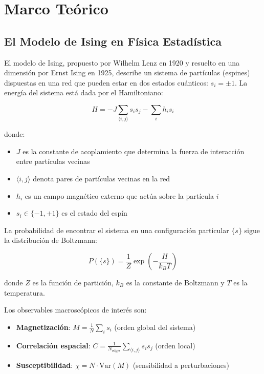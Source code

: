 \documentclass[12pt,a4paper]{article}
\begin{document}
\section{Marco Teórico}

\subsection{El Modelo de Ising en Física Estadística}

El modelo de Ising, propuesto por Wilhelm Lenz en 1920 y resuelto en una dimensión por Ernst Ising en 1925, describe un sistema de partículas (espines) dispuestas en una red que pueden estar en dos estados cuánticos: $s_i = \pm 1$. La energía del sistema está dada por el Hamiltoniano:

\begin{equation}\label{eq:hamiltoniano}
H = -J \sum_{\langle i,j \rangle} s_i s_j - \sum_i h_i s_i
\end{equation}

donde:
\begin{itemize}
    \item $J$ es la constante de acoplamiento que determina la fuerza de interacción entre partículas vecinas
    \item $\langle i,j \rangle$ denota pares de partículas vecinas en la red
    \item $h_i$ es un campo magnético externo que actúa sobre la partícula $i$
    \item $s_i \in \{-1, +1\}$ es el estado del espín
\end{itemize}

La probabilidad de encontrar el sistema en una configuración particular $\{s\}$ sigue la distribución de Boltzmann:

\begin{equation}\label{eq:boltzmann}
P(\{s\}) = \frac{1}{Z} \exp\left(-\frac{H}{k_B T}\right)
\end{equation}

donde $Z$ es la función de partición, $k_B$ es la constante de Boltzmann y $T$ es la temperatura.

Los observables macroscópicos de interés son:
\begin{itemize}
    \item \textbf{Magnetización}: $M = \frac{1}{N}\sum_i s_i$ (orden global del sistema)
    \item \textbf{Correlación espacial}: $C = \frac{1}{N_{\text{edges}}}\sum_{\langle i,j \rangle} s_i s_j$ (orden local)
    \item \textbf{Susceptibilidad}: $\chi = N \cdot \text{Var}(M)$ (sensibilidad a perturbaciones)
\end{itemize}
\end{document}
